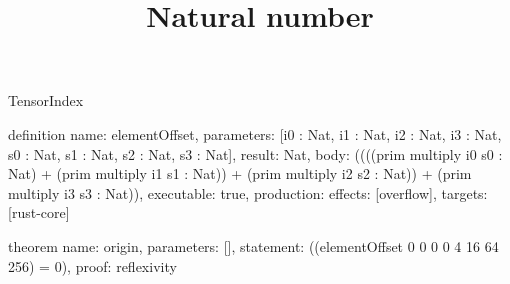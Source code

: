 \begin{lexlean}{TensorIndex}
\title{Natural number}
\begin{semanticmodule}
definition{
  name: elementOffset,
  parameters: [i0 : Nat, i1 : Nat, i2 : Nat, i3 : Nat, s0 : Nat, s1 : Nat, s2 : Nat, s3 : Nat],
  result: Nat,
  body: ((((prim multiply i0 s0 : Nat) + (prim multiply i1 s1 : Nat)) + (prim multiply i2 s2 : Nat)) + (prim multiply i3 s3 : Nat)),
  executable: true,
  production: {effects: [overflow], targets: [rust-core]}
}

theorem{
  name: origin,
  parameters: [],
  statement: ((elementOffset 0 0 0 0 4 16 64 256) = 0),
  proof: reflexivity{}
}
\end{semanticmodule}
\end{lexlean}
